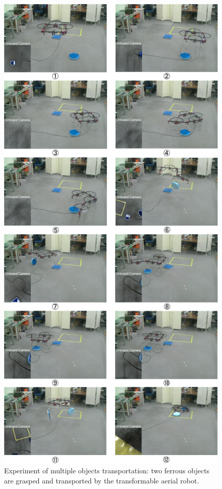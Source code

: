 \begin{figure}[H]
  \begin{center}
    \includegraphics[width=1.0\columnwidth]{figs/experiment.pdf}
  \end{center}
  \caption{Experiment of multiple objects transportation: two ferrous objects are grasped and transported by the transformable aerial robot.\label{figure:experiment}}
\end{figure}
\fi
